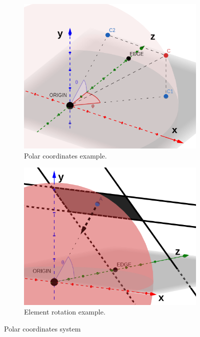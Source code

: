 \begin{figure}[!ht]
    \centering
    \begin{subfigure}[b]{0.49 \linewidth}
    \centering
        \includegraphics[width=0.9\linewidth]{img/video360/polar_coord.png}
        \caption{Polar coordinates example.}
        \label{fig:polar_coordinates}
    \end{subfigure}
    \begin{subfigure}[b]{0.49\linewidth}
    \centering
        \includegraphics[width=0.9\linewidth]{img/video360/normal_vector.png}
        \caption{Element rotation example.}
        \label{fig:element_rotation}
    \end{subfigure}
    \caption{Polar coordinates system}
\end{figure}

